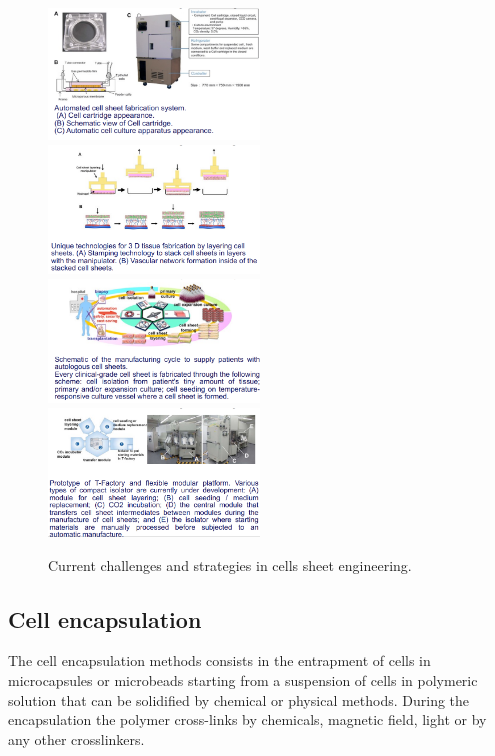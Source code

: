         \begin{figure}[H]
            \begin{multicols}{2}
                \includegraphics[width=0.5\textwidth]{strategies1.png}
                \includegraphics[width=0.5\textwidth]{strategies2.png}
                \includegraphics[width=0.5\textwidth]{strategies3.png}
                \includegraphics[width=0.5\textwidth]{strategies4.png}
            \end{multicols}
            \caption{\label{fig:strategies} Current challenges and strategies in cells sheet engineering.}
    \end{figure}

    \subsection{Cell encapsulation}
    The cell encapsulation methods consists in the entrapment of cells in microcapsules or microbeads starting from a suspension of cells in polymeric solution that can be solidified by chemical or physical methods.
    During the encapsulation the polymer cross-links by chemicals, magnetic field, light or by any other crosslinkers.

